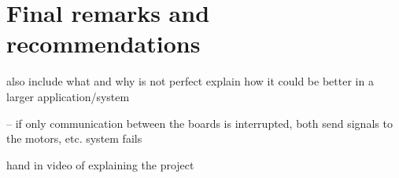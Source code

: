 \section{Final remarks and recommendations}

also include what and why is not perfect
explain how it could be better in a larger application/system

 -- if only communication between the boards is interrupted, both send signals to the motors, etc. system fails


hand in video of explaining the project



